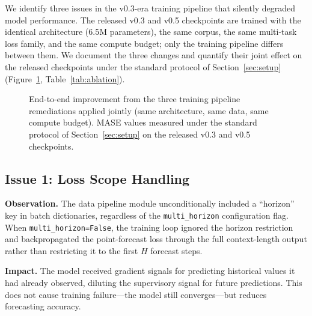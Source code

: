 \documentclass[11pt]{article}
\begin{document}
We identify three issues in the v0.3-era training pipeline that silently degraded model performance. The released v0.3 and v0.5 checkpoints are trained with the identical architecture (6.5M parameters), the same corpus, the same multi-task loss family, and the same compute budget; only the training pipeline differs between them. We document the three changes and quantify their joint effect on the released checkpoints under the standard protocol of Section~\ref{sec:setup} (Figure~\ref{fig:ablation_overview}, Table~\ref{tab:ablation}).

\begin{figure}[t]
\centering
{}
\caption{End-to-end improvement from the three training pipeline remediations applied jointly (same architecture, same data, same compute budget). MASE values measured under the standard protocol of Section~\ref{sec:setup} on the released v0.3 and v0.5 checkpoints.}
\label{fig:ablation_overview}
\end{figure}

\subsection{Issue 1: Loss Scope Handling}
\label{sec:issue1}

\textbf{Observation.} The data pipeline module unconditionally included a ``horizon'' key in batch dictionaries, regardless of the \texttt{multi\_horizon} configuration flag. When \texttt{multi\_horizon=False}, the training loop ignored the horizon restriction and backpropagated the point-forecast loss through the full context-length output rather than restricting it to the first $H$ forecast steps.

\textbf{Impact.} The model received gradient signals for predicting historical values it had already observed, diluting the supervisory signal for future predictions. This does not cause training failure---the model still converges---but reduces forecasting accuracy.
\end{document}
